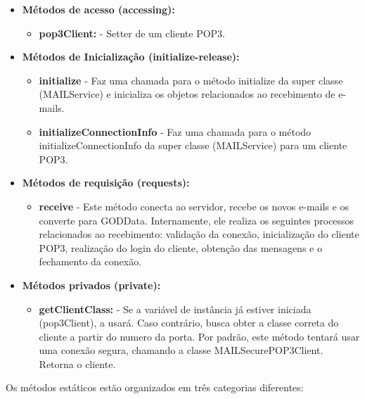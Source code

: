 \begin{itemize}
	\item \textbf{Métodos de acesso (accessing):}
	\begin{itemize}
		\item \textbf{pop3Client:} - Setter de um cliente POP3.
	\end{itemize}
	\item \textbf{Métodos de Inicialização (initialize-release):}
	\begin{itemize}
		\item \textbf{initialize} - Faz uma chamada para o método initialize da super classe (MAILService) e inicializa os objetos relacionados ao recebimento de e-mails.
		\item \textbf{initializeConnectionInfo} - Faz uma chamada para o método initializeConnectionInfo da super classe (MAILService) para um cliente POP3.
	\end{itemize}
	\item \textbf{Métodos de requisição (requests):}
	\begin{itemize}
		\item \textbf{receive} - Este método conecta ao servidor, recebe os novos e-mails e os converte para GODData. Internamente, ele realiza os seguintes processos relacionados ao recebimento: validação da conexão, inicialização do cliente POP3, realização do login do cliente, obtenção das mensagens e o fechamento da conexão.
	\end{itemize}
	\item \textbf{Métodos privados (private):}
	\begin{itemize}
		\item \textbf{getClientClass:} - Se a variável de instância já estiver iniciada (pop3Client), a usará. Caso contrário, busca obter a classe correta do cliente a partir do numero da porta. Por padrão, este método tentará usar uma conexão segura, chamando a classe MAILSecurePOP3Client. Retorna o cliente.
	\end{itemize}
\end{itemize}

Os métodos estáticos estão organizados em três categorias diferentes:

